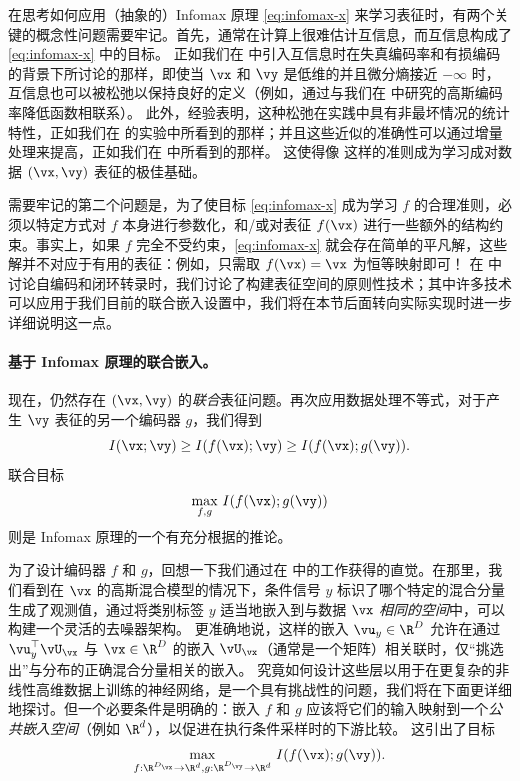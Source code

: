 \documentclass[../../book-main_zh.tex]{subfiles}
\begin{document}
在思考如何应用（抽象的）Infomax 原理 \eqref{eq:infomax-x} 来学习表征时，有两个关键的概念性问题需要牢记。首先，通常在计算上很难估计互信息，而互信息构成了
\eqref{eq:infomax-x} 中的目标。
正如我们在  中引入互信息时在失真编码率和有损编码的背景下所讨论的那样，即使当 $\vx$ 和 $\vy$ 是低维的并且微分熵接近 $-\infty$ 时，互信息也可以被松弛以保持良好的定义（例如，通过与我们在
 中研究的高斯编码率降低函数相联系）。
此外，经验表明，这种松弛在实践中具有非最坏情况的统计特性，正如我们在
 的实验中所看到的那样；并且这些近似的准确性可以通过增量处理来提高，正如我们在  中所看到的那样。
这使得像  这样的准则成为学习成对数据 $(\vx, \vy)$ 表征的极佳基础。

需要牢记的第二个问题是，为了使目标 \eqref{eq:infomax-x} 成为学习 $f$ 的合理准则，必须以特定方式对 $f$ 本身进行参数化，和/或对表征 $f(\vx)$ 进行一些额外的结构约束。事实上，如果 $f$ 完全不受约束，\eqref{eq:infomax-x} 就会存在简单的平凡解，这些解并不对应于有用的表征：例如，只需取 $f(\vx) = \vx$ 为恒等映射即可！
在  中讨论自编码和闭环转录时，我们讨论了构建表征空间的原则性技术；其中许多技术可以应用于我们目前的联合嵌入设置中，我们将在本节后面转向实际实现时进一步详细说明这一点。

\paragraph{基于 Infomax 原理的联合嵌入。}

现在，仍然存在 $(\vx, \vy)$ 的\textit{联合}表征问题。再次应用数据处理不等式，对于产生 $\vy$ 表征的另一个编码器 $g$，我们得到
\begin{equation*}
    I(\vx; \vy) \geq I(f(\vx); \vy) \geq I(f(\vx); g(\vy)).
\end{equation*}
联合目标
\begin{equation}\label{eq:infomax-x-y}
    \max_{f, g}\, I(f(\vx); g(\vy))
\end{equation}
则是 Infomax 原理的一个有充分根据的推论。

为了设计编码器 $f$ 和 $g$，回想一下我们通过在
 中的工作获得的直觉。在那里，我们看到在 $\vx$ 的高斯混合模型的情况下，条件信号 $y$ 标识了哪个特定的混合分量生成了观测值，通过将类别标签 $y$ 适当地嵌入到与数据 $\vx$ \textit{相同的空间}中，可以构建一个灵活的去噪器架构。
更准确地说，这样的嵌入 $\vu_y \in \R^D$ 允许在通过 $\vu_y^\top
\vU_{\vx}$ 与 $\vx \in \R^{D}$ 的嵌入 $\vU_{\vx}$（通常是一个矩阵）相关联时，仅“挑选出”与分布的正确混合分量相关的嵌入。
究竟如何设计这些层以用于在更复杂的非线性高维数据上训练的神经网络，是一个具有挑战性的问题，我们将在下面更详细地探讨。但一个必要条件是明确的：嵌入
$f$ 和 $g$ 应该将它们的输入映射到一个\textit{公共嵌入空间}（例如 $\R^d$），以促进在执行条件采样时的下游比较。
这引出了目标
\begin{equation}\label{eq:infomax-joint}
    \max_{f : \R^{D_{\vx}} \to \R^{d}, g: \R^{D_{\vy}} \to \R^d}\,
    I(f(\vx); g(\vy)).
\end{equation}
\end{document}
